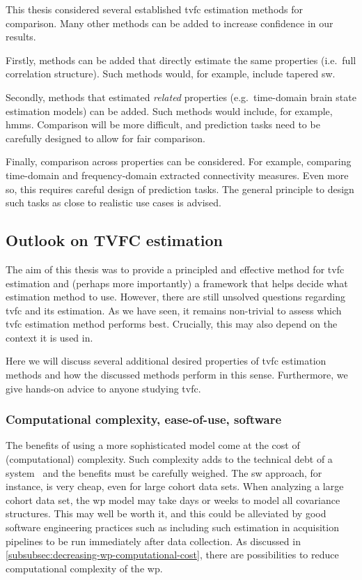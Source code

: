 This thesis considered several established \gls{tvfc} estimation methods for comparison.
Many other methods can be added to increase confidence in our results.

Firstly, methods can be added that directly estimate the same properties (i.e.~full correlation structure).
Such methods would, for example, include tapered \gls{sw}.

Secondly, methods that estimated \emph{related} properties (e.g.~time-domain brain state estimation models) can be added.
Such methods would include, for example, \glspl{hmm}.
Comparison will be more difficult, and prediction tasks need to be carefully designed to allow for fair comparison.

Finally, comparison across properties can be considered.
For example, comparing time-domain and frequency-domain extracted connectivity measures.
Even more so, this requires careful design of prediction tasks.
The general principle to design such tasks as close to realistic use cases is advised.

\subsection{Outlook on TVFC estimation}

The aim of this thesis was to provide a principled and effective method for \gls{tvfc} estimation and (perhaps more importantly) a framework that helps decide what estimation method to use.
However, there are still unsolved questions regarding \gls{tvfc} and its estimation.
As we have seen, it remains non-trivial to assess which \gls{tvfc} estimation method performs best.
Crucially, this may also depend on the context it is used in.

Here we will discuss several additional desired properties of \gls{tvfc} estimation methods and how the discussed methods perform in this sense.
Furthermore, we give hands-on advice to anyone studying \gls{tvfc}.

\subsubsection{Computational complexity, ease-of-use, software}

The benefits of using a more sophisticated model come at the cost of (computational) complexity.
Such complexity adds to the technical debt of a system~\parencite{Sculley2015} and the benefits must be carefully weighed.
The \gls{sw} approach, for instance, is very cheap, even for large cohort data sets.
When analyzing a large cohort data set, the \gls{wp} model may take days or weeks to model all covariance structures.
This may well be worth it, and this could be alleviated by good software engineering practices such as including such estimation in acquisition pipelines to be run immediately after data collection.
%
As discussed in \cref{subsubsec:decreasing-wp-computational-cost}, there are possibilities to reduce computational complexity of the \gls{wp}.

